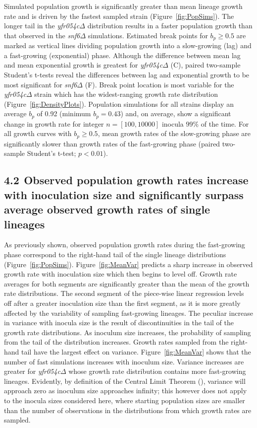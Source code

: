 \documentclass{bioinfo}
\begin{document}
Simulated population growth is significantly greater than mean lineage growth rate and is driven by the fastest sampled strain (Figure~\ref{fig:PopSims}). The longer tail in the \textit{yfr054c}$\Delta$ distribution results in a faster population growth than that observed in the \textit{snf6}$\Delta$ simulations. Estimated break points for $b_p\geq 0.5$ are marked as vertical lines dividing  population growth into a slow-growing (lag) and a fast-growing (exponential) phase. Although the difference between mean lag and mean exponential growth is greatest for \textit{yfr054c}$\Delta$ (C), paired two-sample Student's t-tests reveal the differences between lag and exponential growth to be most significant for \textit{snf6}$\Delta$ (F). Break point location is most variable for the \textit{yfr054c}$\Delta$ strain which has the widest-ranging growth rate distribution (Figure~\ref{fig:DensityPlots}). Population simulations for all strains display an average $b_p$ of 0.92 (minimum $b_p=0.43$) and, on average, show a significant change in growth rate for integer $n=[100,10000]$ inocula $99\%$ of the time. 
For all growth curves with $b_p\geq 0.5$, mean growth rates of the slow-growing phase are significantly slower than growth rates of the fast-growing phase (paired two-sample Student's t-test; $p<0.01$). 

\vspace{-1.2em}
\subsection*{4.2$\>\>$Observed population growth rates increase with inoculation size and significantly surpass average observed growth rates of single lineages}

As previously shown, observed population growth rates during the fast-growing phase correspond to the right-hand tail of the single lineage distributions (Figure~\ref{fig:PopSims}). Figure~\ref{fig:MeanVar} predicts a sharp increase in observed growth rate with inoculation size which then begins to level off. Growth rate averages for both segments are significantly greater than the mean of the growth rate distributions. The second segment of the piece-wise linear regression levels off after a greater inoculation size than the first segment, as it is more greatly affected by the variability of sampling fast-growing lineages. The peculiar increase in variance with inocula size is the result of discontinuities in the tail of the growth rate distributions. As inoculum size increases, the probability of sampling from the tail of the distribution increases. Growth rates sampled from the right-hand tail have the largest effect on variance. Figure~\ref{fig:MeanVar} shows that the number of fast simulations increases with inoculum size. Variance increases are greater for \textit{yfr054c}$\Delta$ whose growth rate distribution contains more fast-growing lineages. Evidently, by definition of the Central Limit Theorem (\citealp{Rice95}), variance will approach zero as inoculum size approaches infinity; this however does not apply to the inocula sizes considered here, where starting population sizes are smaller than the number of observations in the distributions from which growth rates are sampled. 
\end{document}
